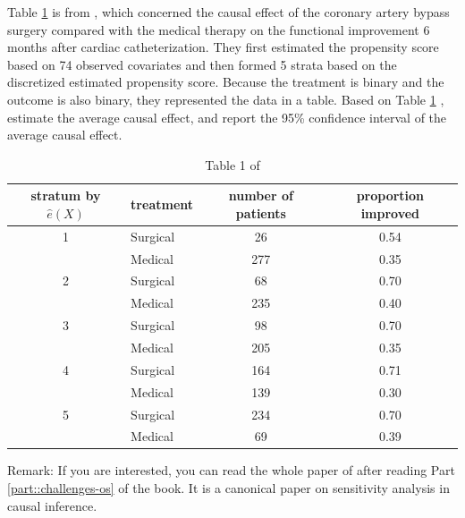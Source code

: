 \begin{HomeworkProblem}\label{exr:11-4}



Table \ref{table::rr1983table1} is from \citet{Rosenbaum::1983JRSSB}, which concerned the causal effect of the coronary artery bypass surgery compared with the medical therapy on the functional improvement 6 months after cardiac catheterization.  They first estimated the propensity score based on 74 observed covariates and then formed 5 strata based on the discretized estimated propensity score. Because the treatment is binary and the outcome is also binary, they represented the data in a table.
Based on Table \ref{table::rr1983table1} , estimate the average causal effect, and report the 95\% confidence interval of the average causal effect.



\begin{table}
\caption{Table 1 of \citet{Rosenbaum::1983JRSSB}}\label{table::rr1983table1}
\begin{tabular}{clcc}
\hline
stratum by $\hat{e}(X)$ & treatment &  number of patients & proportion improved\\
\hline 1 & Surgical & 26 & 0.54 \\
& Medical & 277 & 0.35 \\
2 & Surgical & 68 & 0.70 \\
& Medical & 235 & 0.40 \\
3 & Surgical & 98 & 0.70 \\
& Medical & 205 & 0.35 \\
4 & Surgical & 164 & 0.71 \\
& Medical & 139 & 0.30 \\
5 & Surgical & 234 & 0.70 \\
& Medical & 69 & 0.39 \\
\hline
\end{tabular}
\end{table}


Remark:   If you are interested, you can read the whole paper of \citet{Rosenbaum::1983JRSSB} after reading Part \ref{part::challenges-os} of the book. It is a canonical paper on sensitivity analysis in causal inference.




\end{HomeworkProblem}

